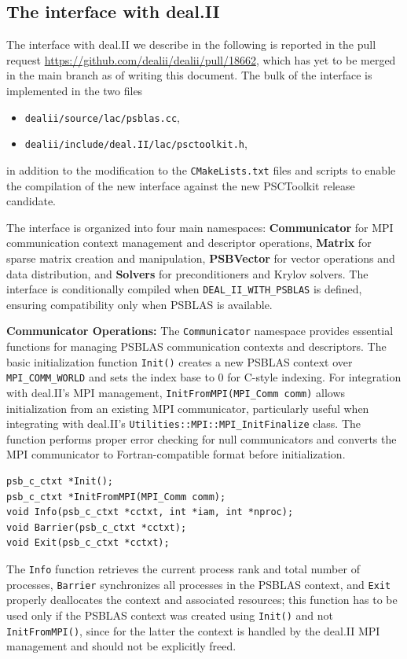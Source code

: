 \documentclass[a4paper,12pt]{article}
\begin{document}
\subsection{The interface with deal.II}

The interface with deal.II we describe in the following is reported in the pull request
\url{https://github.com/dealii/dealii/pull/18662}, which has yet to be merged in the main branch as of writing this document.
The bulk of the interface is implemented in the two files
\begin{itemize}
    \item \texttt{dealii/source/lac/psblas.cc},
    \item \texttt{dealii/include/deal.II/lac/psctoolkit.h},
\end{itemize}
in addition to the modification to the \texttt{CMakeLists.txt} files and scripts to enable the
compilation of the new interface against the new PSCToolkit release candidate.

The interface is organized into four main namespaces: \textbf{Communicator} for MPI communication
context management and descriptor operations, \textbf{Matrix} for sparse matrix creation and manipulation,
\textbf{PSBVector} for vector operations and data distribution, and \textbf{Solvers} for preconditioners
and Krylov solvers. The interface is conditionally compiled when \texttt{DEAL\_II\_WITH\_PSBLAS}
is defined, ensuring compatibility only when PSBLAS is available.

\textbf{Communicator Operations:} The \texttt{Communicator} namespace provides essential functions
for managing PSBLAS communication contexts and descriptors. The basic initialization function
\texttt{Init()} creates a new PSBLAS context over \texttt{MPI\_COMM\_WORLD} and sets the index
base to 0 for C-style indexing. For integration with deal.II's MPI management,
\lstinline{InitFromMPI(MPI_Comm comm)} allows initialization from an existing MPI communicator,
particularly useful when integrating with deal.II's \lstinline{Utilities::MPI::MPI_InitFinalize} class.
The function performs proper error checking for null communicators and converts the MPI communicator to
Fortran-compatible format before initialization.
\begin{lstlisting}[caption=Core communicator functions]
psb_c_ctxt *Init();
psb_c_ctxt *InitFromMPI(MPI_Comm comm);
void Info(psb_c_ctxt *cctxt, int *iam, int *nproc);
void Barrier(psb_c_ctxt *cctxt);
void Exit(psb_c_ctxt *cctxt);
\end{lstlisting}
The \texttt{Info} function retrieves the current process rank and total number of processes,
\texttt{Barrier} synchronizes all processes in the PSBLAS context, and \texttt{Exit} properly deallocates
the context and associated resources; this function has to be used only if the PSBLAS context was created
using \texttt{Init()} and not \texttt{InitFromMPI()}, since for the latter the context is handled by the
deal.II MPI management and should not be explicitly freed.
\end{document}
